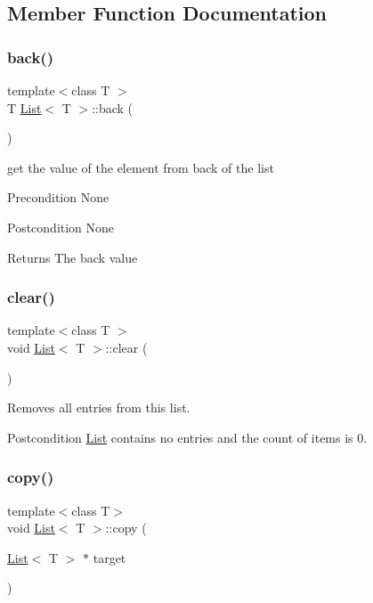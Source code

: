 \subsection{Member Function Documentation}
\mbox{\label{class_list_adcdd54cf42f6a98990618901e1fafa59}} 
\subsubsection{\texorpdfstring{back()}{back()}}
{\footnotesize\ttfamily template$<$class T $>$ \\
T \hyperlink{class_list}{List}$<$ T $>$\+::back (\begin{DoxyParamCaption}{ }\end{DoxyParamCaption})}

get the value of the element from back of the list \begin{DoxyPrecond}{Precondition}
None 
\end{DoxyPrecond}
\begin{DoxyPostcond}{Postcondition}
None 
\end{DoxyPostcond}
\begin{DoxyReturn}{Returns}
The back value 
\end{DoxyReturn}
\mbox{\label{class_list_ae296516a252e11963dbf963727ce429a}} 
\subsubsection{\texorpdfstring{clear()}{clear()}}
{\footnotesize\ttfamily template$<$class T $>$ \\
void \hyperlink{class_list}{List}$<$ T $>$\+::clear (\begin{DoxyParamCaption}{ }\end{DoxyParamCaption})}

Removes all entries from this list. \begin{DoxyPostcond}{Postcondition}
\hyperlink{class_list}{List} contains no entries and the count of items is 0. 
\end{DoxyPostcond}
\mbox{\label{class_list_ac6c3b0e253ce3c9b90053b95769f12a9}} 
\subsubsection{\texorpdfstring{copy()}{copy()}}
{\footnotesize\ttfamily template$<$class T$>$ \\
void \hyperlink{class_list}{List}$<$ T $>$\+::copy (\begin{DoxyParamCaption}\item[{\hyperlink{class_list}{List}$<$ T $>$ $\ast$}]{target }\end{DoxyParamCaption})}

